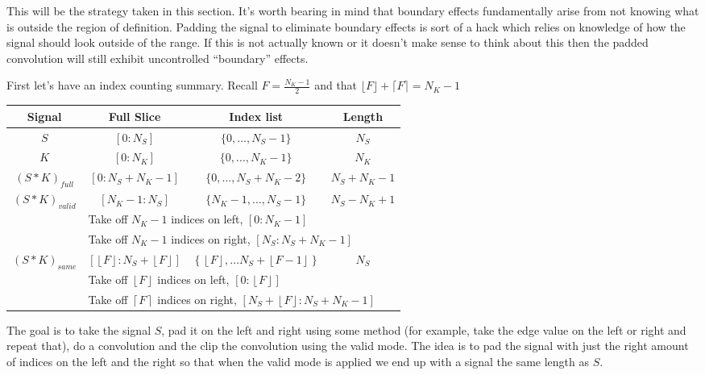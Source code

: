 \documentclass[12pt]{article}
\begin{document}
This will be the strategy taken in this section. It's worth bearing in mind that boundary effects fundamentally arise from not knowing what is outside the region of definition. Padding the signal to eliminate boundary effects is sort of a hack which relies on knowledge of how the signal should look outside of the range. If this is not actually known or it doesn't make sense to think about this then the padded convolution will still exhibit uncontrolled ``boundary'' effects.

First let's have an index counting summary. Recall $F = \frac{N_K-1}{2}$ and that $\lfloor F \rfloor + \lceil F \rceil = N_K-1$

\begin{table}[!h]
\begin{tabular}{|c|c|c|c|}
\hline
Signal & Full Slice & Index list & Length \\ \hline
$S$ & $[0:N_S]$ & $\{0, \ldots, N_S-1\}$ & $N_S$   \\ \hline
$K$ & $[0:N_K]$ & $\{0, \ldots, N_K-1\}$ & $N_K$   \\ \hline
$(S\ast K)_{full}$ & $[0:N_S+N_K-1]$ & $\{0, \ldots, N_S+N_K-2\}$ & $N_S+N_K-1$ \\ \hline
\multirow{3}{*}{$(S\ast K)_{valid}$} & $[N_K-1:N_S]$ & $\{N_K-1,\ldots, N_S-1\}$ & $N_S-N_K+1$ \\ \cline{2-4} 
                  & \multicolumn{3}{l|}{Take off $N_K-1$ indices on left, $[0:N_K-1]$} \\ \cline{2-4} 
                  & \multicolumn{3}{l|}{Take off $N_K-1$ indices on right, $[N_S:N_S+N_K-1]$} \\ \hline
\multirow{3}{*}{$(S\ast K)_{same}$} & $\left[\left\lfloor F \right\rfloor:N_S + \left\lfloor F \right\rfloor\right]$ & $\left\{ \left\lfloor F \right\rfloor, \ldots N_S + \left\lfloor F - 1 \right\rfloor\right\}$ & $N_S$ \\ \cline{2-4} 
                  & \multicolumn{3}{l|}{Take off $\left\lfloor F \right\rfloor$ indices on left, $\left[0:\left\lfloor F \right\rfloor\right]$} \\ \cline{2-4} 
                  & \multicolumn{3}{l|}{Take off $\left\lceil F \right\rceil$ indices on right, $\left[N_S + \left\lfloor F\right\rfloor:N_S + N_K-1 \right]$} \\ \hline
\end{tabular}
\end{table}

The goal is to take the signal $S$, pad it on the left and right using some method (for example, take the edge value on the left or right and repeat that), do a convolution and the clip the convolution using the valid mode. The idea is to pad the signal with just the right amount of indices on the left and the right so that when the valid mode is applied we end up with a signal the same length as $S$. 
\end{document}
